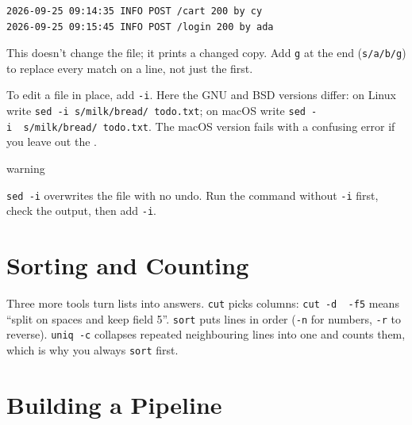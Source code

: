 \begin{codeblock}
\begin{Verbatim}[formatcom=\outputstyle]
2026-09-25 09:14:35 INFO POST /cart 200 by cy
2026-09-25 09:15:45 INFO POST /login 200 by ada
\end{Verbatim}
\end{codeblock}

This doesn't change the file; it prints a changed copy. Add \texttt{g} at the end (\texttt{s/a/b/g}) to replace every match on a line, not just the first.

To edit a file in place, add \texttt{-i}. Here the GNU and BSD versions differ: on Linux write \texttt{sed\ -}\allowbreak{}\texttt{i\ \textquotesingle{}s/}\allowbreak{}\texttt{milk/}\allowbreak{}\texttt{bread/}\allowbreak{}\texttt{\textquotesingle{}\ todo.}\allowbreak{}\texttt{txt}; on macOS write \texttt{sed\ -}\allowbreak{}\texttt{i\ \textquotesingle{}\textquotesingle{}\ \textquotesingle{}s/}\allowbreak{}\texttt{milk/}\allowbreak{}\texttt{bread/}\allowbreak{}\texttt{\textquotesingle{}\ todo.}\allowbreak{}\texttt{txt}. The macOS version fails with a confusing error if you leave out the \texttt{\textquotesingle{}\textquotesingle{}}.

\begin{callout}{warning}

\texttt{sed\ -i} overwrites the file with no undo. Run the command without \texttt{-i} first, check the output, then add \texttt{-i}.

\end{callout}

\section{Sorting and Counting}\label{05-the-everyday-command-line:sorting-and-counting}

Three more tools turn lists into answers. \texttt{cut} picks columns: \texttt{cut\ -d\textquotesingle{}\ \textquotesingle{}\ -f5} means ``split on spaces and keep field 5''. \texttt{sort} puts lines in order (\texttt{-n} for numbers, \texttt{-r} to reverse). \texttt{uniq\ -c} collapses repeated neighbouring lines into one and counts them, which is why you always \texttt{sort} first.


\section{Building a Pipeline}\label{05-the-everyday-command-line:building-a-pipeline}

